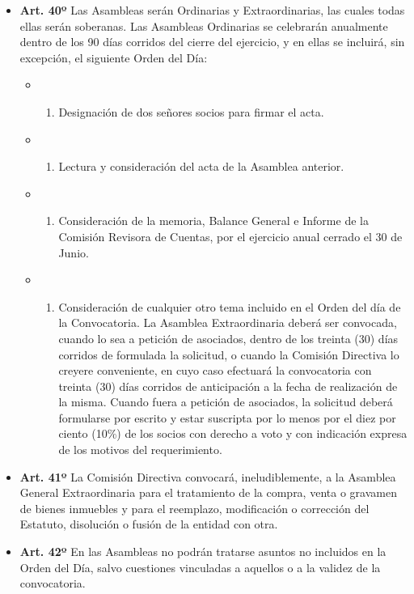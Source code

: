 \documentclass[]{book}
\providecommand{\tightlist}{%
  \setlength{\itemsep}{0pt}\setlength{\parskip}{0pt}}
\begin{document}
\begin{itemize}
\item
  \textbf{Art. 40º} Las Asambleas serán Ordinarias y Extraordinarias,
  las cuales todas ellas serán soberanas. Las Asambleas Ordinarias se
  celebrarán anualmente dentro de los 90 días corridos del cierre del
  ejercicio, y en ellas se incluirá, sin excepción, el siguiente Orden
  del Día:

  \begin{itemize}
  \item
    \begin{enumerate}
    \def\labelenumi{\alph{enumi})}
    \tightlist
    \item
      Designación de dos señores socios para firmar el acta.
    \end{enumerate}
  \item
    \begin{enumerate}
    \def\labelenumi{\alph{enumi})}
    \setcounter{enumi}{1}
    \tightlist
    \item
      Lectura y consideración del acta de la Asamblea anterior.
    \end{enumerate}
  \item
    \begin{enumerate}
    \def\labelenumi{\alph{enumi})}
    \setcounter{enumi}{2}
    \tightlist
    \item
      Consideración de la memoria, Balance General e Informe de la
      Comisión Revisora de Cuentas, por el ejercicio anual cerrado el 30
      de Junio.
    \end{enumerate}
  \item
    \begin{enumerate}
    \def\labelenumi{\alph{enumi})}
    \setcounter{enumi}{3}
    \tightlist
    \item
      Consideración de cualquier otro tema incluido en el Orden del día
      de la Convocatoria. La Asamblea Extraordinaria deberá ser
      convocada, cuando lo sea a petición de asociados, dentro de los
      treinta (30) días corridos de formulada la solicitud, o cuando la
      Comisión Directiva lo creyere conveniente, en cuyo caso efectuará
      la convocatoria con treinta (30) días corridos de anticipación a
      la fecha de realización de la misma. Cuando fuera a petición de
      asociados, la solicitud deberá formularse por escrito y estar
      suscripta por lo menos por el diez por ciento (10\%) de los socios
      con derecho a voto y con indicación expresa de los motivos del
      requerimiento.
    \end{enumerate}
  \end{itemize}
\item
  \textbf{Art. 41º} La Comisión Directiva convocará, ineludiblemente, a
  la Asamblea General Extraordinaria para el tratamiento de la compra,
  venta o gravamen de bienes inmuebles y para el reemplazo, modificación
  o corrección del Estatuto, disolución o fusión de la entidad con otra.
\item
  \textbf{Art. 42º} En las Asambleas no podrán tratarse asuntos no
  incluidos en la Orden del Día, salvo cuestiones vinculadas a aquellos
  o a la validez de la convocatoria.
\end{itemize}
\end{document}
